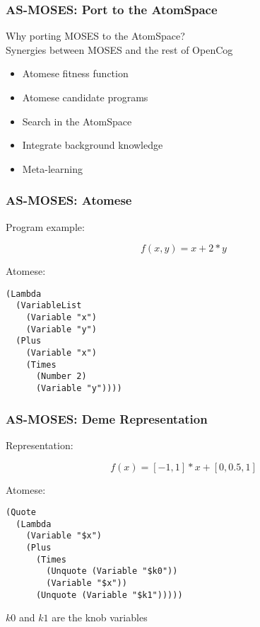 \documentclass{beamer}
\begin{document}
\begin{frame}[fragile]
  \frametitle{AS-MOSES: Port to the AtomSpace}

  Why porting MOSES to the AtomSpace?\\

  \alert{Synergies between MOSES and the rest of OpenCog}\\

  \begin{itemize}
  \item Atomese fitness function
  \item Atomese candidate programs
  \item Search in the AtomSpace
  \item Integrate background knowledge
  \item Meta-learning
  \end{itemize}

\end{frame}

\begin{frame}[fragile]
  \frametitle{AS-MOSES: Atomese}
Program example:

$$f(x, y) = x + 2*y$$

Atomese:

{\small \begin{verbatim}
(Lambda
  (VariableList
    (Variable "x")
    (Variable "y")
  (Plus
    (Variable "x")
    (Times
      (Number 2)
      (Variable "y"))))
\end{verbatim}}

\end{frame}

\begin{frame}[fragile]
  \frametitle{AS-MOSES: Deme Representation}
Representation:

$$f(x) = [-1, 1]*x + [0, 0.5, 1]$$

Atomese:

{\small \begin{verbatim}
(Quote
  (Lambda
    (Variable "$x")
    (Plus
      (Times
        (Unquote (Variable "$k0"))
        (Variable "$x"))
      (Unquote (Variable "$k1")))))
\end{verbatim}}

$k0$ and $k1$ are the knob variables

\end{frame}
\end{document}
